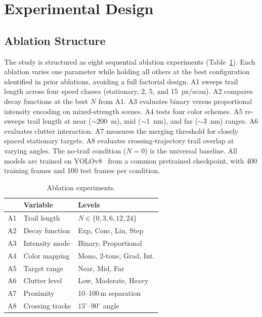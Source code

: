 \documentclass[twocolumn, 10pt]{article}
\begin{document}
\section{Experimental Design}

\subsection{Ablation Structure}

The study is structured as eight sequential ablation experiments (Table~\ref{tab:ablations}). Each ablation varies one parameter while holding all others at the best configuration identified in prior ablations, avoiding a full factorial design. A1 sweeps trail length across four speed classes (stationary, 2, 5, and 15~px/scan). A2 compares decay functions at the best $N$ from A1. A3 evaluates binary versus proportional intensity encoding on mixed-strength scenes. A4 tests four color schemes. A5 re-sweeps trail length at near ($\sim$200~m), mid ($\sim$1~nm), and far ($\sim$3~nm) ranges. A6 evaluates clutter interaction. A7 measures the merging threshold for closely spaced stationary targets. A8 evaluates crossing-trajectory trail overlap at varying angles. The no-trail condition ($N=0$) is the universal baseline. All models are trained on YOLOv8~\cite{Jocher2023YOLOv8} from a common pretrained checkpoint, with 400 training frames and 100 test frames per condition.

\begin{table}[t]
\caption{Ablation experiments.}
\label{tab:ablations}
\centering
\footnotesize
\begin{tabular}{@{}lll@{}}
\toprule
 & \textbf{Variable} & \textbf{Levels} \\
\midrule
A1 & Trail length & $N \in \{0,3,6,12,24\}$ \\
A2 & Decay function & Exp, Conc, Lin, Step \\
A3 & Intensity mode & Binary, Proportional \\
A4 & Color mapping & Mono, 2-tone, Grad, Int. \\
A5 & Target range & Near, Mid, Far \\
A6 & Clutter level & Low, Moderate, Heavy \\
A7 & Proximity & 10--100\,m separation \\
A8 & Crossing tracks & $15^\circ$--$90^\circ$ angle \\
\bottomrule
\end{tabular}
\end{table}
\end{document}
